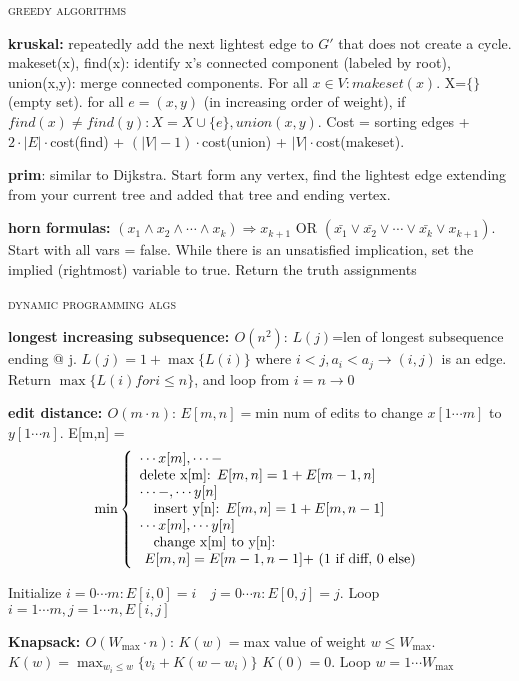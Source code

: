 \documentclass[10pt,twocolumn]{article}
\begin{document}
\begin{center}\textsc{greedy algorithms}\end{center} 
{\bf kruskal:}  repeatedly add the next lightest edge to $G'$ that does not create a cycle. makeset(x), find(x): identify x's connected component (labeled by root), union(x,y): merge connected components. For all $x\in V: makeset(x)$. X=$\{\}$ (empty set). for all $e=(x,y)$ (in increasing order of weight), if $find(x)\neq find(y): X=X \cup \{e\}, union(x,y)$. Cost = sorting edges + $2\cdot |E|\cdot$cost(find) + $(|V|-1)\cdot$cost(union) + $|V|\cdot$cost(makeset).

{\bf prim}: similar to Dijkstra. Start form any vertex, find the lightest edge extending from your current tree and added that tree and ending vertex.

{\bf horn formulas:} $(x_1\land x_2 \land \cdots \land x_k)\Rightarrow x_{k+1}$ OR $(\bar{x_1}\lor \bar{x_2}\lor \cdots \lor \bar{x_k}\lor x_{k+1})$. Start with all vars = false. While there is an unsatisfied implication, set the implied (rightmost) variable to true. Return the truth assignments
	
	
\begin{center}\textsc{dynamic programming algs}\end{center} 
{\bf longest increasing subsequence: $O(n^2)$}:
$L(j)$=len of longest subsequence ending @ j. $L(j)=1+\max\{L(i)\}$ where $i<j,a_i < a_j \rightarrow (i,j)$ is an edge. Return $\max\{L(i) for i\leq n\}$, and loop from $i=n\rightarrow 0$

{\bf edit distance: $O(m\cdot n)$}: $E[m,n]=$min num of edits to change $x[1\cdots m]$ to $y[1\cdots n]$. E[m,n] = \[\min\left\{ \begin{array}{l l} \cdots x[m] , \cdots - \\ \mbox{delete x[m]: $E[m,n]=1+E[m-1,n]$} \\ \cdots -, \cdots y[n] \\ \quad \mbox{insert y[n]: $E[m,n]=1+E[m,n-1]$} \\ \cdots x[m], \cdots y[n] \\ \quad \mbox{change x[m] to y[n]:}\\ \mbox{ $E[m,n]=E[m-1,n-1] +$ (1 if diff, 0 else)}  \end{array} \right. \]

Initialize $i=0\cdots m: E[i,0] = i \quad j=0\cdots n: E[0,j]=j$. Loop $i=1\cdots m, j=1\cdots n, E[i,j]$

{\bf Knapsack: $O(W_{\max}\cdot n)$}: $K(w)=$max value of weight $w\leq W_{\max}$. $K(w)=\displaystyle\max_{w_i\leq w}\{v_i+K(w-w_i)\}$ $K(0)=0$. Loop $w=1\cdots W_{\max}$
\end{document}
